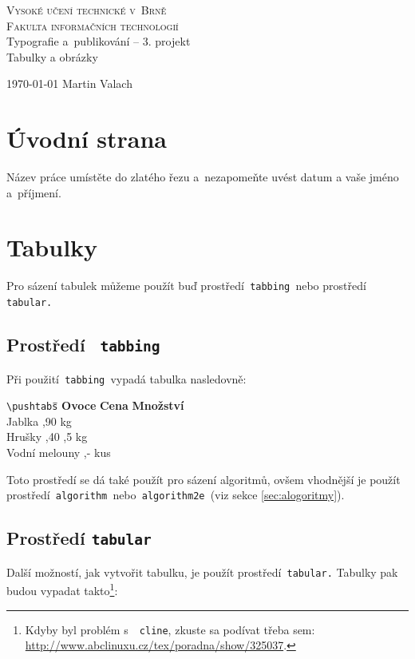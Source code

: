 \documentclass[a4paper, 11pt]{article}
\author{Martin Valach//xvalac12@stud.fit.vutbr.cz}
\begin{document}
    \begin{titlepage}
		\begin{center}
			{\Huge\textsc{
			    Vysoké učení technické v~Brně
			    \\[0.2em]
			}
			\huge\textsc{
			    Fakulta informačních technologií
			}
			}
			{\LARGE
				\\ Typografie a~publikování -- 3. projekt \\[0.3em]
				\Huge Tabulky a obrázky
			}
		\end{center}

		{\Large
			\today
			\hfill Martin Valach
		}
	\end{titlepage}
	
	\section{Úvodní strana}
	Název práce umístěte do zlatého řezu a~nezapomeňte uvést  datum a vaše jméno a~příjmení.
	
	\section{Tabulky}
	Pro sázení tabulek můžeme použít buď prostředí\texttt{ tabbing }nebo prostředí\texttt{ tabular.}
	
	\subsection{Prostředí \texttt{ tabbing}}
	Při použití\texttt{ tabbing }vypadá tabulka nasledovně: 
	
	\begin{tabbing}
	    \verb|\pushtabs|\qquad \= \qquad \qquad\= \kill
    	\textbf{Ovoce} \> \textbf{Cena} \> \textbf{Množství} \\
	    Jablka ,90  kg \\
	    Hrušky ,40 ,5 kg \\
	    Vodní melouny ,-  kus\\
	\end{tabbing}
    Toto prostředí se dá také použít pro sázení algoritmů, ovšem vhodnější je použít prostředí\texttt{ algorithm }nebo\texttt{ algorithm2e }(viz sekce \ref*{sec:alogoritmy}).
	
    \subsection{Prostředí \texttt{tabular}}
    Další možností, jak vytvořit tabulku, je použít prostředí\texttt{ tabular.} Tabulky pak budou vypadat takto\footnote{Kdyby byl problém s~\texttt{ cline}, zkuste sa podívat třeba sem: \url{http://www.abclinuxu.cz/tex/poradna/show/325037}.}:
    
\end{document}
